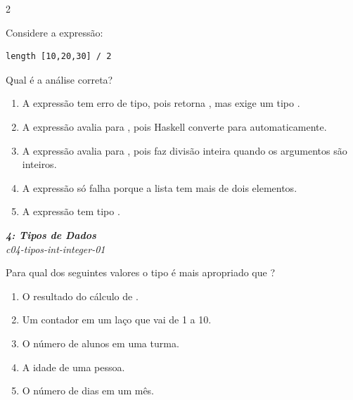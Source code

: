 \documentclass[a4paper,10pt,brazil]{article}
\begin{document}
\begin{multicols}{2}
\begin{flushright}
\end{flushright}
Considere a expressão:

\begin{verbatim}
length [10,20,30] / 2
\end{verbatim}

Qual é a análise correta?

\begin{enumerate}
  \item A expressão tem erro de tipo, pois  retorna , mas \haskellinline{(/)} exige um tipo .
  \item A expressão avalia para , pois Haskell converte  para  automaticamente.
  \item A expressão avalia para , pois \haskellinline{(/)} faz divisão inteira quando os argumentos são inteiros.
  \item A expressão só falha porque a lista tem mais de dois elementos.
  \item A expressão tem tipo .

\end{enumerate}

\begin{flushright}
  \footnotesize
  \textit{\textbf{4: Tipos de Dados}}\\
  \textit{c04-tipos-int-integer-01}\\

\end{flushright}
Para qual dos seguintes valores o tipo  é mais apropriado que ?

\begin{enumerate}
  \item O resultado do cálculo de .

  \item Um contador em um laço que vai de 1 a 10.

  \item O número de alunos em uma turma.

  \item A idade de uma pessoa.

  \item O número de dias em um mês.


\end{enumerate}


\end{multicols}
\end{document}
